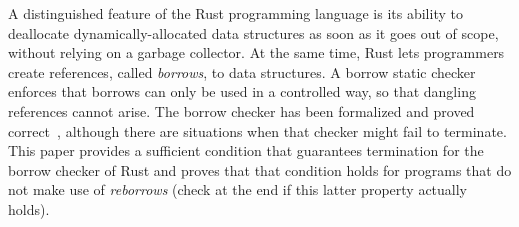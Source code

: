 A distinguished feature of the Rust programming language
is its ability to deallocate dynamically-allocated
data structures as soon as it goes out of scope, without relying on a garbage
collector. At the same time, Rust lets programmers create references,
called \emph{borrows}, to data structures. A borrow static checker enforces
that borrows can only be used in a controlled way, so that dangling references cannot arise.
The borrow checker has been formalized and proved correct~\cite{Pearce21}, although there
are situations when that checker might fail to terminate.
This paper provides a sufficient condition that guarantees termination for the borrow checker
of Rust and proves that that condition holds for programs that do not make use of \emph{reborrows}
(check at the end if this latter property actually holds).
